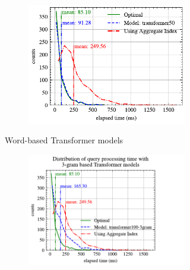 \begin{figure}[p]
\begin{subfigure}{0.45\textwidth}
\begin{subfigure}{\textwidth}
		\end{subfigure}
		\vfill
		\begin{subfigure}{\textwidth}
			\centering
			\includegraphics[]{my/graphics/perf_dist_transformer50_A.pdf}
		\end{subfigure}
		\caption{Word-based Transformer models}
	\end{subfigure}
	\hfill
	\begin{subfigure}{0.45\textwidth}
		\begin{subfigure}{\textwidth}
			\centering
			\includegraphics[]{my/graphics/perf_dist_transformer100_3gram_A.pdf}
		\end{subfigure}
		\vfill
		\begin{subfigure}{\textwidth}
			\centering

\end{subfigure}
\end{subfigure}
\end{figure}
